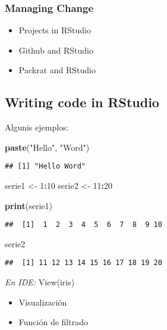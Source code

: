 \documentclass[]{article}
\newenvironment{Shaded}{\begin{snugshade}}{\end{snugshade}}
\newcommand{\KeywordTok}[1]{\textcolor[rgb]{0.13,0.29,0.53}{\textbf{#1}}}
\newcommand{\DecValTok}[1]{\textcolor[rgb]{0.00,0.00,0.81}{#1}}
\newcommand{\StringTok}[1]{\textcolor[rgb]{0.31,0.60,0.02}{#1}}
\newcommand{\OperatorTok}[1]{\textcolor[rgb]{0.81,0.36,0.00}{\textbf{#1}}}
\newcommand{\NormalTok}[1]{#1}
\providecommand{\tightlist}{%
  \setlength{\itemsep}{0pt}\setlength{\parskip}{0pt}}
\begin{document}
\subsubsection{\texorpdfstring{\textbf{Managing
Change}}{Managing Change}}\label{managing-change}

\begin{itemize}
\tightlist
\item
  Projects in RStudio
\item
  Github and RStudio
\item
  Packrat and RStudio
\end{itemize}

\subsection{Writing code in RStudio}\label{writing-code-in-rstudio}

Algunis ejemplos:

\begin{Shaded}
\begin{Highlighting}[]
\KeywordTok{paste}\NormalTok{(}\StringTok{"Hello"}\NormalTok{, }\StringTok{"Word"}\NormalTok{)}
\end{Highlighting}
\end{Shaded}

\begin{verbatim}
## [1] "Hello Word"
\end{verbatim}

\begin{Shaded}
\begin{Highlighting}[]
\NormalTok{serie1 <-}\StringTok{ }\DecValTok{1}\OperatorTok{:}\DecValTok{10}
\NormalTok{serie2 <-}\StringTok{ }\DecValTok{11}\OperatorTok{:}\DecValTok{20}

\KeywordTok{print}\NormalTok{(serie1)}
\end{Highlighting}
\end{Shaded}

\begin{verbatim}
##  [1]  1  2  3  4  5  6  7  8  9 10
\end{verbatim}

\begin{Shaded}
\begin{Highlighting}[]
\NormalTok{serie2}
\end{Highlighting}
\end{Shaded}

\begin{verbatim}
##  [1] 11 12 13 14 15 16 17 18 19 20
\end{verbatim}

\emph{En IDE:} View(iris)

\begin{itemize}
\tightlist
\item
  Visualización
\item
  Función de filtrado
\end{itemize}
\end{document}
